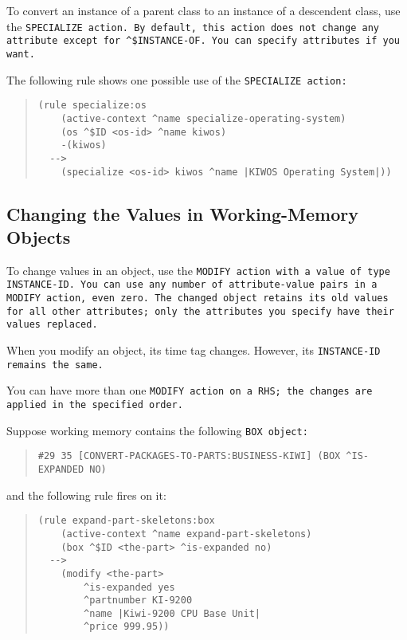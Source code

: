 To convert an instance of a parent class to an instance of a
descendent class, use the \tt{SPECIALIZE} action. By default, this
action does not change any attribute except for
\verb|^$INSTANCE-OF|. You can specify attributes if you want.

The following rule shows one possible use of the \tt{SPECIALIZE}
action:

\begin{quote}
\begin{verbatim}
(rule specialize:os
    (active-context ^name specialize-operating-system)
    (os ^$ID <os-id> ^name kiwos)
    -(kiwos)
  -->
    (specialize <os-id> kiwos ^name |KIWOS Operating System|))
\end{verbatim}
\end{quote}

\subsection{Changing the Values in Working-Memory Objects}

To change values in an object, use the \tt{MODIFY} action with a value
of type \tt{INSTANCE-ID}. You can use any number of attribute-value
pairs in a \tt{MODIFY} action, even zero. The changed object retains
its old values for all other attributes; only the attributes you
specify have their values replaced.

\begin{note}
  When you modify an object, its time tag changes. However, its
  \tt{INSTANCE-ID} remains the same.
\end{note}

You can have more than one \tt{MODIFY} action on a RHS; the changes
are applied in the specified order.

Suppose working memory contains the following \tt{BOX} object:

\begin{quote}
\begin{verbatim}
#29 35 [CONVERT-PACKAGES-TO-PARTS:BUSINESS-KIWI] (BOX ^IS-EXPANDED NO)
\end{verbatim}
\end{quote}
and the following rule fires on it:
\begin{quote}
\begin{verbatim}
(rule expand-part-skeletons:box
    (active-context ^name expand-part-skeletons)
    (box ^$ID <the-part> ^is-expanded no)
  -->
    (modify <the-part>
        ^is-expanded yes
        ^partnumber KI-9200
        ^name |Kiwi-9200 CPU Base Unit|
        ^price 999.95))
\end{verbatim}
\end{quote}

